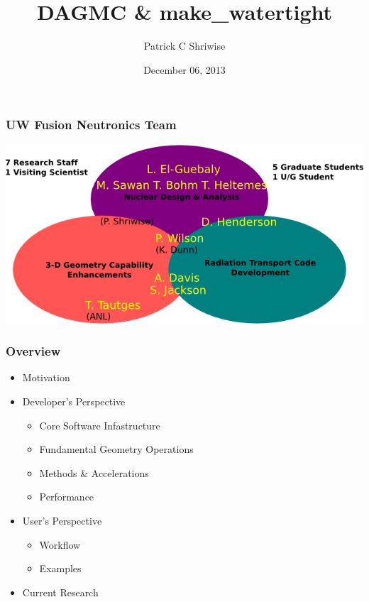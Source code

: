 \documentclass{beamer}
\begin{document}
\title{DAGMC \& make\_watertight}
\author{Patrick C Shriwise}
\date{ December 06, 2013}

\maketitle


\begin{frame}
\frametitle{UW Fusion Neutronics Team}
\includegraphics[scale=0.65, trim = 0 0 20 0]{UWNeutronicsVenn.png}
\end{frame}

\begin{frame}
\frametitle{Overview}

\begin{itemize}
\item Motivation
\item Developer's Perspective
	\begin{itemize}
	\item Core Software Infastructure
	\item Fundamental Geometry Operations
	\item Methods \& Accelerations
	\item Performance
	\end{itemize}
\item User's Perspective
	\begin{itemize}
	\item Workflow
	\item Examples
	\end{itemize}
\item Current Research
\end{itemize}
\end{frame}
\end{document}
